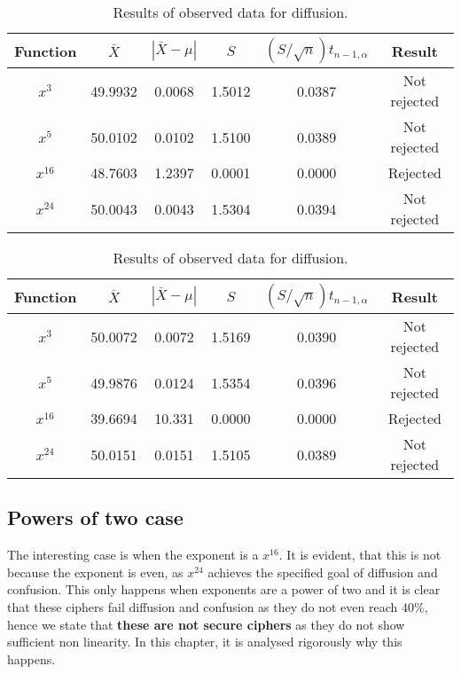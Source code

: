 \documentclass{Resources/UoBLab1}
\theoremstyle{definition}
\begin{document}
\begin{table}[H]
    \centering
    \begin{tabular}{|c|c|c|c|c|c|}
        \hline
        Function & $\bar{X}$ & $|\bar{X} - \mu|$ & $S$ &  $(S/\sqrt{n})t_{n-1,\alpha}$ & Result \\
        \hline
        $x^3$ & 49.9932 & 0.0068 & 1.5012 & 0.0387 & Not rejected \\
        $x^5$ & 50.0102 & 0.0102 & 1.5100 & 0.0389 & Not rejected \\
        $x^{16}$ & 48.7603 & 1.2397 & 0.0001 & 0.0000 & Rejected \\
        $x^{24}$ & 50.0043 & 0.0043 & 1.5304 &  0.0394 & Not rejected \\
        \hline
    \end{tabular}
    \caption{Results of observed data for confusion.}\label{tab:hypothesis-testing-conf}
    \centering
    \begin{tabular}{|c|c|c|c|c|c|}
        \hline
        Function & $\bar{X}$ & $|\bar{X} - \mu|$ & $S$ & $(S/\sqrt{n})t_{n-1,\alpha}$ & Result \\
        \hline
        $x^3$ & 50.0072 & 0.0072 & 1.5169 & 0.0390 & Not rejected \\
        $x^5$ & 49.9876 & 0.0124 & 1.5354 & 0.0396 & Not rejected \\
        $x^{16}$ & 39.6694 & 10.331 & 0.0000 & 0.0000 & Rejected \\
        $x^{24}$ & 50.0151 & 0.0151 & 1.5105 & 0.0389 & Not rejected \\
        \hline
    \end{tabular}
    \caption{Results of observed data for diffusion.}\label{tab:hypothesis-testing-dif}
\end{table}


\subsection{Powers of two case}\label{sub:powers-of-two}
The interesting case is when the exponent is a $x^{16}$. It is evident, that this is not because the exponent is even, as $x^{24}$ achieves the specified goal of diffusion and confusion. This only happens when exponents are a power of two and it is clear that these ciphers fail diffusion and confusion as they do not even reach $40\%$, hence we state that \textbf{these are not secure ciphers} as they do not show sufficient non linearity. In this chapter, it is analysed rigorously why this happens.
\end{document}
